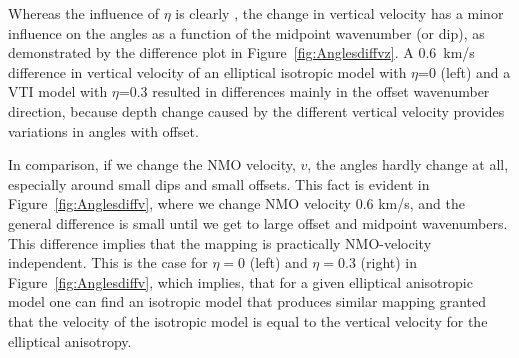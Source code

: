 Whereas the influence of $\eta$ is clearly , the
change in vertical velocity has a minor influence on the angles as a
function of the midpoint wavenumber (or dip), as demonstrated by the
difference plot in Figure~\ref{fig:Anglesdiffvz}. A 0.6~km/s
difference in vertical velocity of an elliptical isotropic model with $\eta$=0 (left) and a VTI model with
$\eta$=0.3 resulted in differences mainly in the offset wavenumber
direction, because depth change caused by the different vertical
velocity provides variations in angles with offset.

In comparison, if we change the NMO velocity, $v$, the angles hardly
change at all, especially around small dips and small offsets. This
fact is evident in Figure~\ref{fig:Anglesdiffv}, where we change
NMO velocity 0.6 km/s, and the general difference is small until we get
to large offset and midpoint wavenumbers. This difference implies that
the mapping is practically NMO-velocity independent. This is the case for $\eta=0$ (left) and $\eta=0.3$ (right)
in Figure~\ref{fig:Anglesdiffv}, which implies,  that for a given elliptical anisotropic model
one can find an isotropic model that produces similar mapping granted that the velocity of the isotropic model
is equal to the vertical velocity for the elliptical anisotropy.


